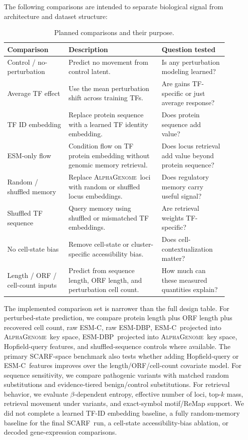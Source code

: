 \documentclass[11pt]{article}
\newcommand{\ag}{\textsc{AlphaGenome}}
\newcommand{\scarf}{\textsc{SCARF}}
\newcommand{\esm}{\textsc{ESM-C}}
\newcommand{\esmdbp}{\textsc{ESM-DBP}}
\begin{document}
The following comparisons are intended to separate biological signal from architecture and dataset structure:

\begin{table}[H]
\centering
\caption{Planned comparisons and their purpose.}
\label{tab:comparisons}
\begin{tabular}{p{0.25\linewidth}p{0.38\linewidth}p{0.27\linewidth}}
\toprule
\textbf{Comparison} & \textbf{Description} & \textbf{Question tested} \\
\midrule
Control / no-perturbation & Predict no movement from control latent. & Is any perturbation modeling learned? \\
Average TF effect & Use the mean perturbation shift across training TFs. & Are gains TF-specific or just average response? \\
TF ID embedding & Replace protein sequence with a learned TF identity embedding. & Does protein sequence add value? \\
ESM-only flow & Condition flow on TF protein embedding without genomic memory retrieval. & Does locus retrieval add value beyond protein sequence? \\
Random / shuffled memory & Replace \ag\ loci with random or shuffled locus embeddings. & Does regulatory memory carry useful signal? \\
Shuffled TF sequence & Query memory using shuffled or mismatched TF embeddings. & Are retrieval weights TF-specific? \\
No cell-state bias & Remove cell-state or cluster-specific accessibility bias. & Does cell-contextualization matter? \\
Length / ORF / cell-count inputs & Predict from sequence length, ORF length, and perturbation cell count. & How much can these measured quantities explain? \\
\bottomrule
\end{tabular}
\end{table}

The implemented comparison set is narrower than the full design table. For perturbed-state prediction, we compare protein length plus ORF length plus recovered cell count, raw \esm, raw \esmdbp, \esm\ projected into \ag\ key space, \esmdbp\ projected into \ag\ key space, Hopfield-query features, and shuffled-sequence controls where available. The primary \scarf-space benchmark also tests whether adding Hopfield-query or \esm\ features improves over the length/ORF/cell-count covariate model. For sequence sensitivity, we compare pathogenic variants with matched random substitutions and evidence-tiered benign/control substitutions. For retrieval behavior, we evaluate \(\beta\)-dependent entropy, effective number of loci, top-\(k\) mass, retrieval movement under variants, and exact-symbol motif/ReMap support. We did not complete a learned TF-ID embedding baseline, a fully random-memory baseline for the final \scarf\ run, a cell-state accessibility-bias ablation, or decoded gene-expression comparisons.
\end{document}
